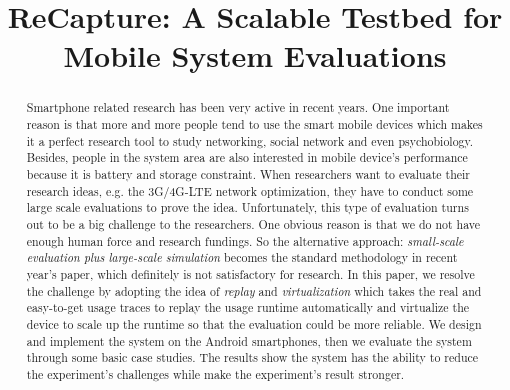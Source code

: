 \documentclass[10pt,conference]{IEEEtran}
\begin{document}
%
\title{ReCapture: A Scalable Testbed for Mobile System Evaluations}

\author{
}

\maketitle


\begin{abstract}
Smartphone related research has been very active in recent years. One important reason is that more and more people tend to use the smart mobile devices which makes it a perfect research tool to study networking, social network and even psychobiology. Besides, people in the system area are also interested in mobile device's performance because it is battery and storage constraint. When researchers want to evaluate their research ideas, e.g. the 3G/4G-LTE network optimization, they have to conduct some large scale evaluations to prove the idea. Unfortunately, this type of evaluation turns out to be a big challenge to the researchers. One obvious reason is that we do not have enough human force and research fundings. So the alternative approach: \emph{small-scale evaluation plus large-scale simulation} becomes the standard methodology in recent year's paper, which definitely is not satisfactory for research. In this paper, we resolve the challenge by adopting the idea of \emph{replay} and \emph{virtualization} which takes the real and easy-to-get usage traces to replay the usage runtime automatically and virtualize the device to scale up the runtime so that the evaluation could be more reliable. We design and implement the system on the Android smartphones, then we evaluate the system through some basic case studies. The results show the system has the ability to reduce the experiment's challenges while make the experiment's result stronger.
\end{abstract}

\IEEEpeerreviewmaketitle









{\footnotesize

}  %
\end{document}

